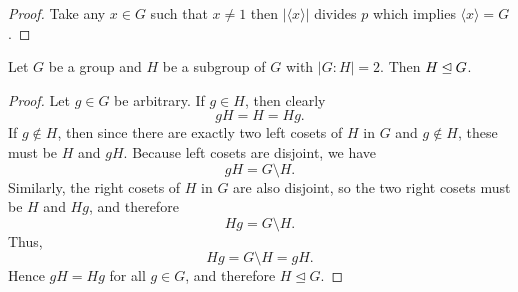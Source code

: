 \begin{proof}
    Take any $x \in G$ such that $x \neq 1$ then $|\langle x \rangle|$ divides $p$ which implies  $\langle x \rangle = G$. 
\end{proof}

\begin{proposition}
    Let $G$ be a group and $H$ be a subgroup of $G$ with $|G:H|=2$. Then $H \unlhd G$. 
\end{proposition}

\begin{proof}
Let \( g \in G \) be arbitrary. If \( g \in H \), then clearly
\[
gH = H = Hg.
\]
If \( g \notin H \), then since there are exactly two left cosets of \( H \) in \( G \)
and \( g \notin H \), these must be \( H \) and \( gH \).
Because left cosets are disjoint, we have
\[
gH = G \setminus H.
\]
Similarly, the right cosets of \( H \) in \( G \) are also disjoint, 
so the two right cosets must be \( H \) and \( Hg \),
and therefore
\[
Hg = G \setminus H.
\]
Thus,
\[
Hg = G \setminus H = gH.
\]
Hence \( gH = Hg \) for all \( g \in G \),
and therefore \( H \trianglelefteq G \).
\end{proof}

